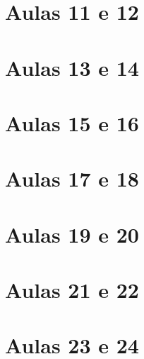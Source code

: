 \begin{apendicesenv}
    \chapter{Aulas 11 e 12} \label{ApendiceG} 
    \chapter{Aulas 13 e 14} \label{ApendiceH} 
    \chapter{Aulas 15 e 16} \label{ApendiceI} 
    \chapter{Aulas 17 e 18} \label{ApendiceJ} 
    \chapter{Aulas 19 e 20} \label{ApendiceK} 
    \chapter{Aulas 21 e 22} \label{ApendiceL} 
    \chapter{Aulas 23 e 24} \label{ApendiceM} 


\end{apendicesenv}
